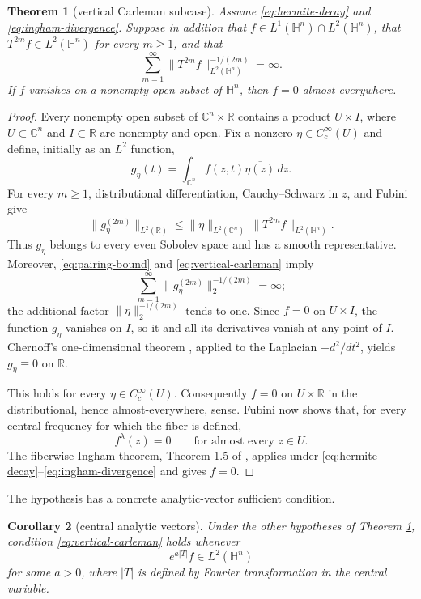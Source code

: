 \documentclass[11pt]{article}
\newtheorem{theorem}{Theorem}
\newtheorem{corollary}[theorem]{Corollary}
\newcommand{\Hn}{\mathbb H^n}
\newcommand{\Cn}{\mathbb C^n}
\newcommand{\R}{\mathbb R}
\begin{document}
\begin{theorem}[vertical Carleman subcase]\label{thm:main}
Assume \eqref{eq:hermite-decay} and \eqref{eq:ingham-divergence}.  Suppose in
addition that $f\in L^1(\Hn)\cap L^2(\Hn)$, that $T^{2m}f\in L^2(\Hn)$ for
every $m\ge1$, and that
\begin{equation}\label{eq:vertical-carleman}
 \sum_{m=1}^\infty
 \|T^{2m}f\|_{L^2(\Hn)}^{-1/(2m)}=\infty.
\end{equation}
If $f$ vanishes on a nonempty open subset of $\Hn$, then $f=0$ almost
everywhere.
\end{theorem}

\begin{proof}
Every nonempty open subset of $\Cn\times\R$ contains a product $U\times I$,
where $U\subset\Cn$ and $I\subset\R$ are nonempty and open.  Fix a nonzero
$\eta\in C_c^\infty(U)$ and define, initially as an $L^2$ function,
\[
 g_\eta(t)=\int_{\Cn}f(z,t)\overline{\eta(z)}\,dz.
\]
For every $m\ge1$, distributional differentiation, Cauchy--Schwarz in $z$,
and Fubini give
\begin{equation}\label{eq:pairing-bound}
 \|g_\eta^{(2m)}\|_{L^2(\R)}
 \le \|\eta\|_{L^2(\Cn)}\,
       \|T^{2m}f\|_{L^2(\Hn)}.
\end{equation}
Thus $g_\eta$ belongs to every even Sobolev space and has a smooth
representative.  Moreover, \eqref{eq:pairing-bound} and
\eqref{eq:vertical-carleman} imply
\[
 \sum_{m=1}^\infty
 \|g_\eta^{(2m)}\|_2^{-1/(2m)}=\infty;
\]
the additional factor $\|\eta\|_2^{-1/(2m)}$ tends to one.  Since $f=0$ on
$U\times I$, the function $g_\eta$ vanishes on $I$, so it and all its
derivatives vanish at any point of $I$.  Chernoff's one-dimensional theorem
\cite{Chernoff}, applied to the Laplacian $-d^2/dt^2$, yields
$g_\eta\equiv0$ on $\R$.

This holds for every $\eta\in C_c^\infty(U)$.  Consequently
$f=0$ on $U\times\R$ in the distributional, hence almost-everywhere, sense.
Fubini now shows that, for every central frequency for which the fiber is
defined,
\[
 f^\lambda(z)=0\qquad\text{for almost every }z\in U.
\]
The fiberwise Ingham theorem, Theorem 1.5 of \cite{BGST}, applies under
\eqref{eq:hermite-decay}--\eqref{eq:ingham-divergence} and gives $f=0$.
\end{proof}

The hypothesis has a concrete analytic-vector sufficient condition.

\begin{corollary}[central analytic vectors]\label{cor:analytic}
Under the other hypotheses of Theorem \ref{thm:main}, condition
\eqref{eq:vertical-carleman} holds whenever
\[
 e^{a|T|}f\in L^2(\Hn)
\]
for some $a>0$, where $|T|$ is defined by Fourier transformation in the
central variable.
\end{corollary}
\end{document}
